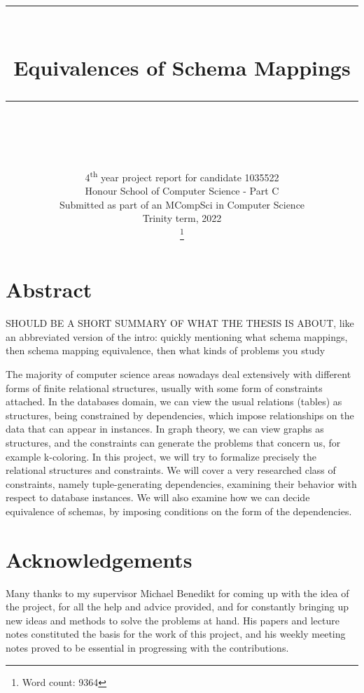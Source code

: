 \documentclass[11pt, a4paper, dvipsnames]{article}
\newcommand\blankpage{
    \null
    \thispagestyle{empty}%
    \addtocounter{page}{-1}%
    \newpage}
\newcommand{\HRule}[1]{\rule{\linewidth}{#1}}
\begin{document}
\title{ \normalsize \textsc{}
		\\ [2.0cm]
		\HRule{0.5pt} \\
		\LARGE \textbf{Equivalences of Schema Mappings}
		\HRule{0.5pt} \\ [0.5cm]
		\normalsize  \vspace*{3\baselineskip}}
\date{}
\author{
		4\textsuperscript{th} year project report for candidate 1035522\\
        Honour School of Computer Science - Part C\\
        Submitted as part of an MCompSci in Computer Science\\
		Trinity term, 2022\\ \footnote{Word count: 9364}	
		}

\maketitle
\thispagestyle{empty}
\newpage
\blankpage

\setcounter{page}{3}

\justifying

\section{Abstract}
SHOULD BE A SHORT SUMMARY OF WHAT THE THESIS IS ABOUT, like an abbreviated version of the intro: quickly mentioning what schema mappings, then schema mapping equivalence, then what kinds of problems you study

The majority of computer science areas nowadays deal extensively with different forms of finite relational structures, usually with some form of constraints attached. In the databases domain, we can view the usual relations (tables) as structures, being constrained by dependencies, which impose relationships on the data that can appear in instances. In graph theory, we can view graphs as structures, and the constraints can generate the problems that concern us, for example k-coloring. In this project, we will try to formalize precisely the relational structures and constraints. We will cover a very researched class of constraints, namely tuple-generating dependencies, examining their behavior with respect to database instances. We will also examine how we can decide equivalence of schemas, by imposing conditions on the form of the dependencies.

\section{Acknowledgements}
Many thanks to my supervisor Michael Benedikt for coming up with the idea of the project, for all the help and advice provided, and for constantly bringing up new ideas and methods to solve the problems at hand. His papers and lecture notes constituted the basis for the work of this project, and his weekly meeting notes proved to be essential in progressing with the contributions.
\end{document}
